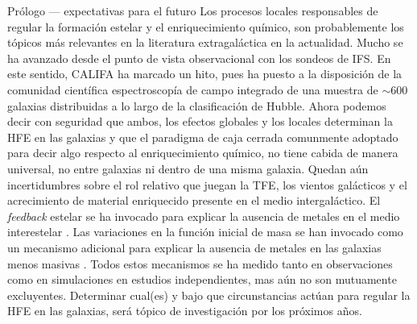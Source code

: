 \documentclass[xcolor=dvipsnames,4pt,hyperref={colorlinks,citecolor=black,linkcolor=black,urlcolor=black}]{beamer}
\begin{document}
\begin{frame}[allowframebreaks]{Prólogo --- expectativas para el futuro}
%
Los procesos locales responsables de regular la formación estelar y el enriquecimiento químico, son
probablemente los tópicos más relevantes en la literatura extragaláctica en la actualidad. Mucho se
ha avanzado desde el punto de vista observacional con los sondeos de IFS. En este sentido, CALIFA ha
marcado un hito, pues ha puesto a la disposición de la comunidad científica espectroscopía de campo
integrado de una muestra de $\sim600$ galaxias distribuidas a lo largo de la clasificación de
Hubble. Ahora podemos decir con seguridad que ambos, los efectos globales y los locales determinan
la HFE en las galaxias y que el paradigma de caja cerrada comunmente adoptado para decir algo
respecto al enriquecimiento químico, no tiene cabida de manera universal, no entre galaxias ni
dentro de una misma galaxia. Quedan aún incertidumbres sobre el rol relativo que juegan la TFE, los
vientos galácticos y el acrecimiento de material enriquecido presente en el medio intergaláctico. El
\emph{feedback} estelar se ha invocado para explicar la ausencia de metales en el medio interestelar
\citep{Tremonti2004, Kobayashi2007}. Las variaciones en la función inicial de masa se han invocado
como un mecanismo adicional para explicar la ausencia de metales en las galaxias menos masivas
\citep{Koppen2007}. Todos estos mecanismos se ha medido tanto en observaciones como en simulaciones
en estudios independientes, mas aún no son mutuamente excluyentes. Determinar cual(es) y bajo que
circunstancias actúan para regular la HFE en las galaxias, será tópico de investigación por los
próximos años.
%
\end{frame}

\end{document}
